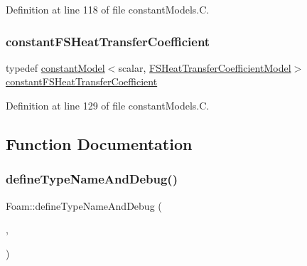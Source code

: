 Definition at line 118 of file constant\+Models.\+C.

\mbox{\label{namespaceFoam_a1a8374d33d29cd2e004e8a98ac1f3d32}} 
\subsubsection{\texorpdfstring{constant\+F\+S\+Heat\+Transfer\+Coefficient}{constantFSHeatTransferCoefficient}}
{\footnotesize\ttfamily typedef \hyperlink{classFoam_1_1constantModel}{constant\+Model}$<$scalar, \hyperlink{classFoam_1_1FSHeatTransferCoefficientModel}{F\+S\+Heat\+Transfer\+Coefficient\+Model}$>$ \hyperlink{namespaceFoam_a1a8374d33d29cd2e004e8a98ac1f3d32}{constant\+F\+S\+Heat\+Transfer\+Coefficient}}



Definition at line 129 of file constant\+Models.\+C.



\subsection{Function Documentation}
\mbox{\label{namespaceFoam_a4f8db0d59e02bebe6498e0d168fbd891}} 
\subsubsection{\texorpdfstring{define\+Type\+Name\+And\+Debug()}{defineTypeNameAndDebug()}\hspace{0.1cm}{\footnotesize\ttfamily [1/50]}}
{\footnotesize\ttfamily Foam\+::define\+Type\+Name\+And\+Debug (\begin{DoxyParamCaption}\item[{\hyperlink{classFoam_1_1multiphysicsControl}{multiphysics\+Control}}]{,  }\item[{0}]{ }\end{DoxyParamCaption})}

\mbox{\label{namespaceFoam_a25d39bdb67bee9ec0b4a1328227bf3e8}} 
